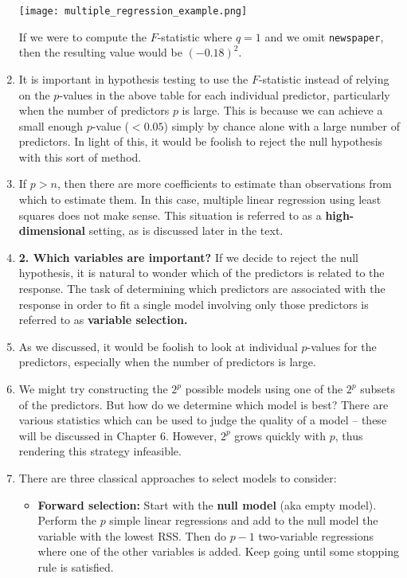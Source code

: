 \documentclass[10pt]{article}
\begin{document}
\begin{enumerate}
	\texttt{[image: multiple\_regression\_example.png]}
	
	If we were to compute the $F$-statistic where $q = 1$ and we omit {\tt newspaper}, then the resulting value would be $(-0.18)^2$.
	\item It is important in hypothesis testing to use the $F$-statistic instead of relying on the $p$-values in the above table for each individual predictor, particularly when the number of predictors $p$ is large.  This is because we can achieve a small enough $p$-value ($< 0.05$) simply by chance alone with a large number of predictors.  In light of this, it would be foolish to reject the null hypothesis with this sort of method.
	
	\item If $p > n$, then there are more coefficients to estimate than observations from which to estimate them.  In this case, multiple linear regression using least squares does not make sense.  This situation is referred to as a \textbf{high-dimensional} setting, as is discussed later in the text.	
	\item \textbf{2. Which variables are important?} If we decide to reject the null hypothesis, it is natural to wonder which of the predictors is related to the response.  The task of determining which predictors are associated with the response in order to fit a single model involving only those predictors is referred to as \textbf{variable selection.}
	\item As we discussed, it would be foolish to look at individual $p$-values for the predictors, especially when the number of predictors is large.
	\item We might try constructing the $2^p$ possible models using one of the $2^p$ subsets of the predictors.  But how do we determine which model is best?  There are various statistics which can be used to judge the quality of a model -- these will be discussed in Chapter 6. However, $2^p$ grows quickly with $p$, thus rendering this strategy infeasible.
	\item There are three classical approaches to select models to consider:
		\begin{itemize}
			\item \textbf{Forward selection:} Start with the \textbf{null model} (aka empty model).  Perform the $p$ simple linear regressions and add to the null model the variable with the lowest RSS.  Then do $p-1$ two-variable regressions where one of the other variables is added.  Keep going until some stopping rule is satisfied.

\end{itemize}
\end{enumerate}
\end{document}
